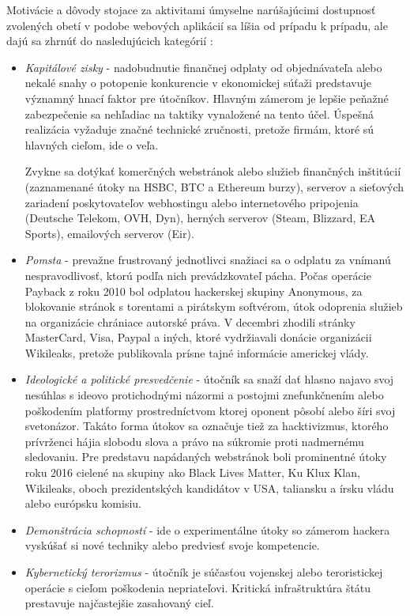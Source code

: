 \documentclass[12pt, a4paper]{article}
\begin{document}
Motivácie a dôvody stojace za aktivitami úmyselne narúšajúcimi dostupnosť zvolených obetí v podobe
webových aplikácií sa líšia od prípadu k prípadu, ale dajú sa zhrnúť do nasledujúcich kategórií 
\cite{why-attack} \cite{ddos-attacks}:
\begin{itemize}
\itemsep0em 
\item \emph{Kapitálové zisky} - nadobudnutie finančnej odplaty od objednávateľa alebo nekalé snahy o 
potopenie konkurencie v ekonomickej súťaži predstavuje významný hnací faktor pre útočníkov. 
Hlavným zámerom je lepšie peňažné zabezpečenie sa nehľadiac na taktiky vynaložené na tento účel. 
Úspešná realizácia vyžaduje značné technické zručnosti, pretože firmám, ktoré sú hlavných cieľom,
ide o veľa. 

Zvykne sa dotýkať komerčných webstránok alebo služieb finančných inštitúcií (zaznamenané útoky na HSBC, 
BTC a  Ethereum burzy), serverov a sieťových zariadení poskytovateľov webhostingu alebo internetového 
pripojenia (Deutsche Telekom, OVH, Dyn), herných serverov (Steam, Blizzard, EA Sports), emailových serverov 
(Eir). \cite{why-attack}

\item \emph{Pomsta} - prevažne frustrovaný jednotlivci snažiaci sa o odplatu za vnímanú 
nespravodlivosť, ktorú podľa nich prevádzkovateľ pácha. Počas operácie Payback z roku 2010 bol odplatou
hackerskej skupiny Anonymous, za blokovanie stránok s torentami a pirátskym softvérom, útok odoprenia 
služieb na organizácie chrániace autorské práva. V decembri zhodili stránky MasterCard, Visa, Paypal a 
iných, ktoré vydržiavali donácie organizácii Wikileaks, pretože publikovala prísne tajné informácie
americkej vlády.

\item \emph{Ideologické a politické presvedčenie} - útočník sa snaží dať hlasno najavo svoj nesúhlas s 
ideovo protichodnými názormi a postojmi znefunkčnením alebo poškodením platformy prostredníctvom ktorej 
oponent pôsobí alebo šíri svoj svetonázor. Takáto forma útokov sa označuje tiež za hacktivizmus, ktorého 
prívrženci hájia slobodu slova a právo na súkromie proti nadmernému sledovaniu. Pre predstavu napádaných 
webstránok boli prominentné útoky roku 2016 cielené na skupiny ako Black Lives Matter, Ku Klux Klan, 
Wikileaks, oboch prezidentských kandidátov v USA, taliansku a írsku vládu alebo európsku komisiu. 
\cite{why-attack}

\item \emph{Demonštrácia schopností} - ide o experimentálne útoky so zámerom hackera vyskúšať si nové 
techniky alebo predviesť svoje kompetencie.
 
\item\emph{Kybernetický terorizmus} - útočník je súčasťou vojenskej alebo teroristickej operácie s cieľom
poškodenia nepriateľovi. Kritická infraštruktúra štátu prestavuje najčastejšie zasahovaný cieľ.
\end{itemize}
\end{document}

